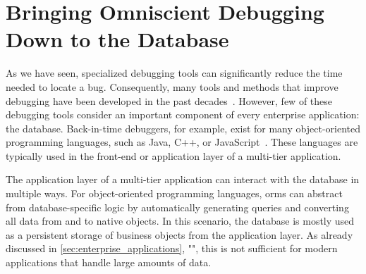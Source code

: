 \chapter{Bringing Omniscient Debugging Down to the Database}
\label{sec:db_odb}

\newcommand{\tool}{TAR\-DISP}
\newcommand{\SQLextension}{Back-in-time SQL}

As we have seen, specialized debugging tools can significantly reduce the time needed to locate a bug.
Consequently, many tools and methods that improve debugging have been developed in the past decades~\cite{wong16:a_survey_on_software}.
However, few of these debugging tools consider an important component of every enterprise application: the database.
Back-in-time debuggers, for example, exist for many object-oriented programming languages, such as Java, C++, or JavaScript~\cite{feldman88:igor_a_system,lewis03:debugging_backwards_in_time,barr16:time-travel_debugging_for_javascriptnode,wong16:a_survey_on_software}.
These languages are typically used in the front-end or application layer of a multi-tier application.



The application layer of a multi-tier application can interact with the database in multiple ways.
For object-oriented programming languages, \acp{orm} can abstract from database-specific logic by automatically generating queries and converting all data from and to native objects.
In this scenario, the database is mostly used as a persistent storage of business objects from the application layer.
As already discussed in \cref{sec:enterprise_applications}, "", 
this is not sufficient for modern applications that handle large amounts of data.

